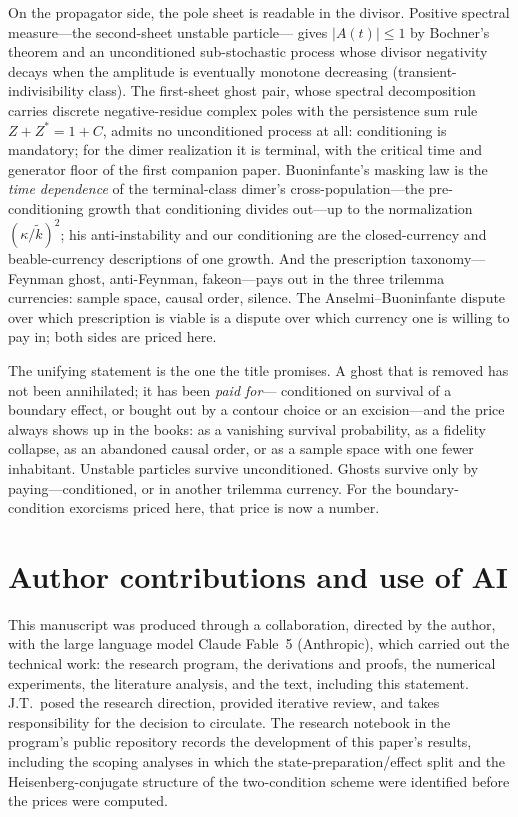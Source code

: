 \documentclass[11pt]{article}
\theoremstyle{definition}
\theoremstyle{remark}
\newcommand{\wt}{\widetilde{k}}
\begin{document}
On the propagator side, the pole sheet is readable in the divisor.
Positive spectral measure---the second-sheet unstable particle---%
gives $|A(t)|\le1$ by Bochner's theorem and an unconditioned
sub-stochastic process whose divisor negativity decays when the
amplitude is eventually monotone decreasing (transient-indivisibility class). The first-sheet ghost pair, whose spectral decomposition
carries discrete negative-residue complex poles with the persistence
sum rule $Z+Z^{*}=1+C$, admits no unconditioned process at all:
conditioning is mandatory; for the dimer realization it is terminal, with the critical time and
generator floor of the first companion paper. Buoninfante's masking
law is the \emph{time dependence} of the terminal-class dimer's
cross-population---the
pre-conditioning growth that conditioning divides out---up to the
normalization $(\kappa/\wt)^{2}$; his
anti-instability and our conditioning are the closed-currency and
beable-currency descriptions of one growth. And the prescription
taxonomy---Feynman ghost, anti-Feynman, fakeon---pays out in the three
trilemma currencies: sample space, causal order, silence. The
Anselmi--Buoninfante dispute over which prescription is viable is a
dispute over which currency one is willing to pay in; both sides are
priced here.

The unifying statement is the one the title promises. A ghost that is
removed has not been annihilated; it has been \emph{paid for}---%
conditioned on survival of a boundary effect, or bought out by a
contour choice or an excision---and the price always shows up in the
books: as a vanishing survival probability, as a fidelity collapse,
as an abandoned causal order, or as a sample space with one fewer
inhabitant. Unstable particles survive unconditioned. Ghosts survive
only by paying---conditioned, or in another trilemma currency. For the
boundary-condition exorcisms priced here, that price is now a number.

\section*{Author contributions and use of AI}

This manuscript was produced through a collaboration, directed by the
author, with the large language model Claude Fable~5 (Anthropic),
which carried out the technical work: the research program, the
derivations and proofs, the numerical experiments, the literature
analysis, and the text, including this statement. J.T.\ posed the
research direction, provided iterative review, and takes
responsibility for the decision to circulate. The research notebook
in the program's public repository records the development of this
paper's results, including the scoping analyses in which the
state-preparation/effect split and the Heisenberg-conjugate structure
of the two-condition scheme were identified before the prices were
computed.
\end{document}

